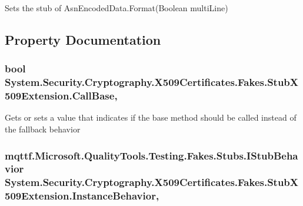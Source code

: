 Sets the stub of Asn\-Encoded\-Data.\-Format(\-Boolean multi\-Line)



\subsection{Property Documentation}
\hypertarget{class_system_1_1_security_1_1_cryptography_1_1_x509_certificates_1_1_fakes_1_1_stub_x509_extension_a73b4e3047842f780e43cd7a33bc94b4f}{
\subsubsection[{Call\-Base}]{\setlength{\rightskip}{0pt plus 5cm}bool System.\-Security.\-Cryptography.\-X509\-Certificates.\-Fakes.\-Stub\-X509\-Extension.\-Call\-Base\hspace{0.3cm}{\ttfamily [get]}, {\ttfamily [set]}}}\label{class_system_1_1_security_1_1_cryptography_1_1_x509_certificates_1_1_fakes_1_1_stub_x509_extension_a73b4e3047842f780e43cd7a33bc94b4f}


Gets or sets a value that indicates if the base method should be called instead of the fallback behavior

\hypertarget{class_system_1_1_security_1_1_cryptography_1_1_x509_certificates_1_1_fakes_1_1_stub_x509_extension_ab302c65cf78e3fadf1862c6eda6de0cc}{
\subsubsection[{Instance\-Behavior}]{\setlength{\rightskip}{0pt plus 5cm}mqttf.\-Microsoft.\-Quality\-Tools.\-Testing.\-Fakes.\-Stubs.\-I\-Stub\-Behavior System.\-Security.\-Cryptography.\-X509\-Certificates.\-Fakes.\-Stub\-X509\-Extension.\-Instance\-Behavior\hspace{0.3cm}{\ttfamily [get]}, {\ttfamily [set]}}}\label{class_system_1_1_security_1_1_cryptography_1_1_x509_certificates_1_1_fakes_1_1_stub_x509_extension_ab302c65cf78e3fadf1862c6eda6de0cc}


